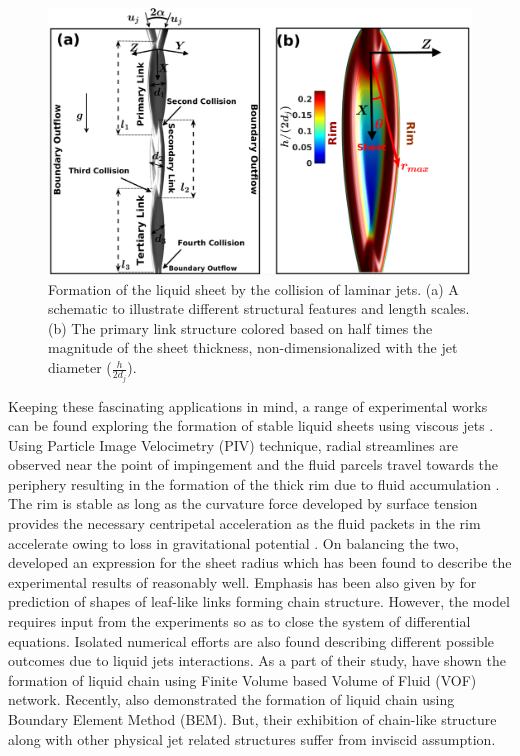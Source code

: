 \documentclass{jfm}
\begin{document}
\begin{figure}
	\centering
	\includegraphics[width=\linewidth]{Figure1}
	\caption{Formation of the liquid sheet by the collision of laminar jets. (a) A schematic to illustrate different structural features and length scales. (b) The primary link structure colored based on half times the magnitude of the sheet thickness, non-dimensionalized with the jet diameter ($\frac{h}{2d_j}$).}
	\label{Figure::schematic}
\end{figure}
Keeping these fascinating applications in mind, a range of experimental works can be found exploring the formation of stable liquid sheets using viscous jets \citep{choo2001parametric,choo2002velocity,bush2004collision}. Using Particle Image Velocimetry (PIV) technique, radial streamlines are observed near the point of impingement and the fluid parcels travel towards the periphery resulting in the formation of the thick rim due to fluid accumulation \citep{choo2002velocity,bush2004collision}. The rim is stable as long as the curvature force developed by surface tension provides the necessary centripetal acceleration as the fluid packets in the rim accelerate owing to loss in gravitational potential \citep{bremond2006atomization}. On balancing the two, \cite{taylor1960formation} developed an expression for the sheet radius which has been found to describe the experimental results of \cite{bush2004collision} reasonably well. Emphasis has been also given by \cite{bush2004collision} for prediction of shapes of leaf-like links forming chain structure. However, the model requires input from the experiments so as to close the system of differential equations. Isolated numerical efforts are also found describing different possible outcomes due to liquid jets interactions. As a part of their study, \cite{chen2013high} have shown the formation of liquid chain using Finite Volume based Volume of Fluid (VOF) network. Recently, \cite{da2016surface} also demonstrated the formation of liquid chain using Boundary Element Method (BEM). But, their exhibition of chain-like structure along with other physical jet related structures suffer from inviscid assumption.\\
\end{document}
